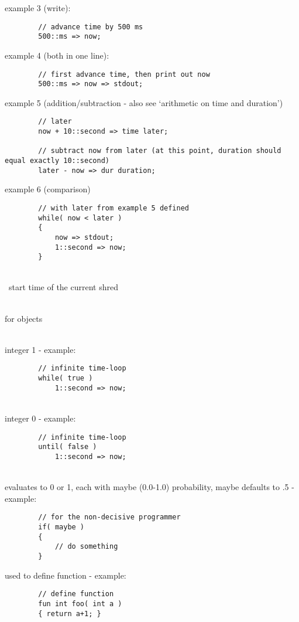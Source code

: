 example 3 (write):
\begin{verbatim}
        // advance time by 500 ms
        500::ms => now;
\end{verbatim}

example 4 (both in one line):
\begin{verbatim}
        // first advance time, then print out now
        500::ms => now => stdout;
\end{verbatim}

example 5 (addition/subtraction - also see `arithmetic on time and duration')
\begin{verbatim}
        // later
        now + 10::second => time later;

        // subtract now from later (at this point, duration should equal exactly 10::second)
        later - now => dur duration;
\end{verbatim}

example 6 (comparison)
\begin{verbatim}
        // with later from example 5 defined
        while( now < later )
        {
            now => stdout;
            1::second => now;
        }
\end{verbatim}

\\\
start time of the current shred

\\
for objects

\\
integer 1 - example:
\begin{verbatim}
        // infinite time-loop
        while( true )
            1::second => now;
\end{verbatim}

\\
integer 0 - example:
\begin{verbatim}
        // infinite time-loop
        until( false )
            1::second => now;
\end{verbatim}

\\
evaluates to 0 or 1, each with maybe (0.0-1.0) probability, maybe defaults to .5 - example:
\begin{verbatim}
        // for the non-decisive programmer
        if( maybe )
        {
            // do something
        }
\end{verbatim}

used to define function - example:
\begin{verbatim}
        // define function
        fun int foo( int a )
        { return a+1; }
\end{verbatim}

